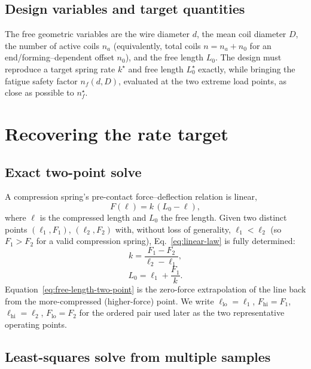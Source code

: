 \documentclass[11pt]{article}
\begin{document}
\subsection{Design variables and target quantities}

The free geometric variables are the wire diameter $d$, the mean coil
diameter $D$, the number of active coils $n_a$ (equivalently, total
coils $n = n_a + n_0$ for an end/forming--dependent offset $n_0$), and
the free length $L_0$. The design must reproduce a target spring rate
$k^{\star}$ and free length $L_0^{\star}$ exactly, while bringing the
fatigue safety factor $n_f(d,D)$, evaluated at the two extreme load
points, as close as possible to $n_f^{\star}$.

\section{Recovering the rate target}

\subsection{Exact two-point solve}

A compression spring's pre-contact force--deflection relation is linear,
\begin{equation}
F(\ell) = k\,(L_0 - \ell),
\label{eq:linear-law}
\end{equation}
where $\ell$ is the compressed length and $L_0$ the free length. Given
two distinct points $(\ell_1,F_1)$, $(\ell_2,F_2)$ with, without loss of
generality, $\ell_1 < \ell_2$ (so $F_1 > F_2$ for a valid compression
spring), Eq.~\eqref{eq:linear-law} is fully determined:
\begin{equation}
k = \frac{F_1 - F_2}{\ell_2 - \ell_1},
\label{eq:rate-two-point}
\end{equation}
\begin{equation}
L_0 = \ell_1 + \frac{F_1}{k}.
\label{eq:free-length-two-point}
\end{equation}
Equation~\eqref{eq:free-length-two-point} is the zero-force extrapolation
of the line back from the more-compressed (higher-force) point. We write
$\ell_{\mathrm{lo}} = \ell_1$, $F_{\mathrm{hi}}=F_1$,
$\ell_{\mathrm{hi}}=\ell_2$, $F_{\mathrm{lo}}=F_2$ for the ordered pair
used later as the two representative operating points.

\subsection{Least-squares solve from multiple samples}
\end{document}
